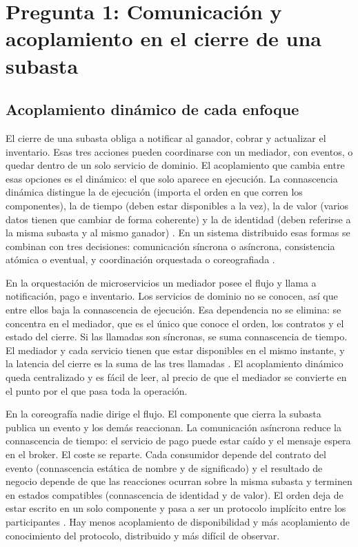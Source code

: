 \section{Pregunta 1: Comunicación y acoplamiento en el cierre de una subasta}

\subsection{Acoplamiento dinámico de cada enfoque}
El cierre de una subasta obliga a notificar al ganador, cobrar y actualizar el inventario. Esas tres acciones pueden coordinarse con un mediador, con eventos, o quedar dentro de un solo servicio de dominio. El acoplamiento que cambia entre esas opciones es el dinámico: el que solo aparece en ejecución. La connascencia dinámica distingue la de ejecución (importa el orden en que corren los componentes), la de tiempo (deben estar disponibles a la vez), la de valor (varios datos tienen que cambiar de forma coherente) y la de identidad (deben referirse a la misma subasta y al mismo ganador) \parencite{richards2020fundamentals}. En un sistema distribuido esas formas se combinan con tres decisiones: comunicación síncrona o asíncrona, consistencia atómica o eventual, y coordinación orquestada o coreografiada \parencite{ford2021hard}.

En la orquestación de microservicios un mediador posee el flujo y llama a notificación, pago e inventario. Los servicios de dominio no se conocen, así que entre ellos baja la connascencia de ejecución. Esa dependencia no se elimina: se concentra en el mediador, que es el único que conoce el orden, los contratos y el estado del cierre. Si las llamadas son síncronas, se suma connascencia de tiempo. El mediador y cada servicio tienen que estar disponibles en el mismo instante, y la latencia del cierre es la suma de las tres llamadas \parencite{richards2020fundamentals}. El acoplamiento dinámico queda centralizado y es fácil de leer, al precio de que el mediador se convierte en el punto por el que pasa toda la operación.

En la coreografía nadie dirige el flujo. El componente que cierra la subasta publica un evento y los demás reaccionan. La comunicación asíncrona reduce la connascencia de tiempo: el servicio de pago puede estar caído y el mensaje espera en el broker. El coste se reparte. Cada consumidor depende del contrato del evento (connascencia estática de nombre y de significado) y el resultado de negocio depende de que las reacciones ocurran sobre la misma subasta y terminen en estados compatibles (connascencia de identidad y de valor). El orden deja de estar escrito en un solo componente y pasa a ser un protocolo implícito entre los participantes \parencite{ford2021hard}. Hay menos acoplamiento de disponibilidad y más acoplamiento de conocimiento del protocolo, distribuido y más difícil de observar.

